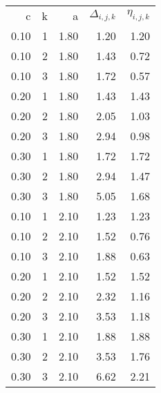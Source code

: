 \begin{tabular}{rrrrr}
c & k & a & $\Delta_{i,j,k}$ & $\eta_{i,j,k}$ \\
0.10 & 1 & 1.80 & 1.20 & 1.20 \\
0.10 & 2 & 1.80 & 1.43 & 0.72 \\
0.10 & 3 & 1.80 & 1.72 & 0.57 \\
0.20 & 1 & 1.80 & 1.43 & 1.43 \\
0.20 & 2 & 1.80 & 2.05 & 1.03 \\
0.20 & 3 & 1.80 & 2.94 & 0.98 \\
0.30 & 1 & 1.80 & 1.72 & 1.72 \\
0.30 & 2 & 1.80 & 2.94 & 1.47 \\
0.30 & 3 & 1.80 & 5.05 & 1.68 \\
0.10 & 1 & 2.10 & 1.23 & 1.23 \\
0.10 & 2 & 2.10 & 1.52 & 0.76 \\
0.10 & 3 & 2.10 & 1.88 & 0.63 \\
0.20 & 1 & 2.10 & 1.52 & 1.52 \\
0.20 & 2 & 2.10 & 2.32 & 1.16 \\
0.20 & 3 & 2.10 & 3.53 & 1.18 \\
0.30 & 1 & 2.10 & 1.88 & 1.88 \\
0.30 & 2 & 2.10 & 3.53 & 1.76 \\
0.30 & 3 & 2.10 & 6.62 & 2.21 \\
\end{tabular}
